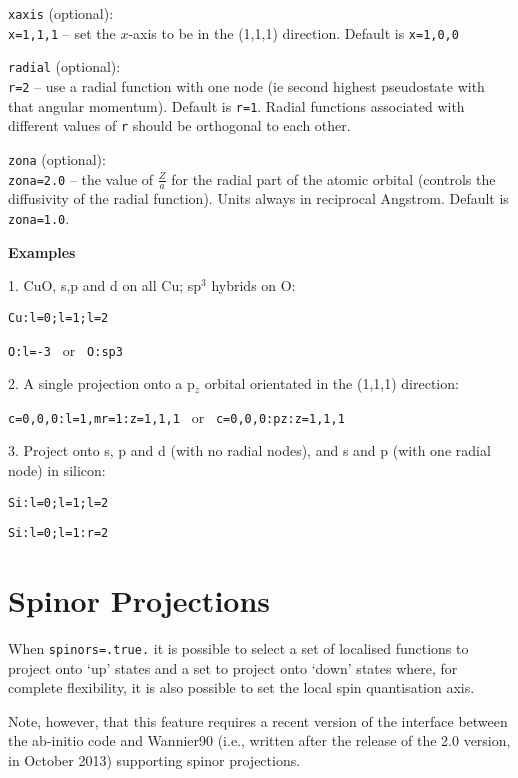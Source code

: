 \noindent
\verb#xaxis# (optional):\\
\verb#x=1,1,1#  --  set the $x$-axis to be in the (1,1,1) direction. Default is
\verb#x=1,0,0#

\noindent
\verb#radial# (optional):\\
\verb#r=2#      --  use a radial function with one node (ie second highest
pseudostate with that angular momentum). Default is
\verb#r=1#. Radial functions associated with different values of
\verb#r# should be orthogonal to each other. 

\noindent
\verb#zona# (optional):\\
\verb#zona=2.0# -- the value of $\frac{Z}{a}$ for the radial part of the
atomic orbital (controls the diffusivity of the radial
function). Units always in reciprocal Angstrom. Default is \verb#zona=1.0#.



\noindent
\textbf{Examples}

1. CuO, s,p and d on all Cu; sp$^3$ hybrids on O:

\verb#Cu:l=0;l=1;l=2 #

\verb#O:l=-3 #  or  \verb# O:sp3#

2. A single projection onto a p$_z$ orbital orientated in the (1,1,1)
 direction:

\verb#c=0,0,0:l=1,mr=1:z=1,1,1 # or \verb# c=0,0,0:pz:z=1,1,1#

3. Project onto s, p and d (with no radial nodes), and s and p (with one
   radial node) in silicon:

\verb#Si:l=0;l=1;l=2#

\verb#Si:l=0;l=1:r=2#

\section{Spinor Projections}
When \verb#spinors=.true.# it is possible to select a set of localised
functions to project onto `up' states and a set to project onto `down'
states where, for complete flexibility, it is also possible to set the
local spin quantisation axis.

Note, however, that this feature requires a recent version of the 
interface between the ab-initio code and Wannier90 (i.e., written after
the release of the 2.0 version, in October 2013) supporting 
spinor projections. 

